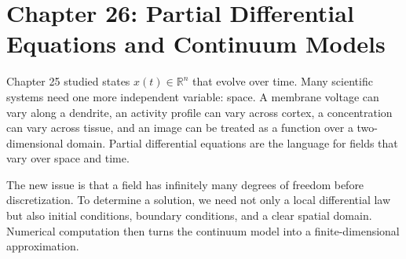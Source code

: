 \section{Chapter 26: Partial Differential Equations and Continuum Models}
\label{ch:partial-differential-equations-continuum-models}

Chapter 25 studied states \(x(t)\in\mathbb{R}^n\) that evolve over time. Many scientific systems need one more independent variable: space. A membrane voltage can vary along a dendrite, an activity profile can vary across cortex, a concentration can vary across tissue, and an image can be treated as a function over a two-dimensional domain. Partial differential equations are the language for fields that vary over space and time.

The new issue is that a field has infinitely many degrees of freedom before discretization. To determine a solution, we need not only a local differential law but also initial conditions, boundary conditions, and a clear spatial domain. Numerical computation then turns the continuum model into a finite-dimensional approximation.

